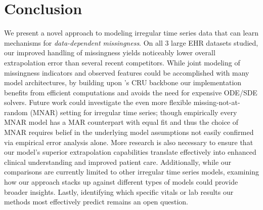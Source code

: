 \section{Conclusion}
We present a novel approach to modeling irregular time series data that can learn mechanisms for \emph{data-dependent missingness}. On all 3 large EHR datasets studied, our improved handling of missingness yields noticeably lower overall extrapolation error than several recent competitors.
While joint modeling of missingness indicators and observed features could be accomplished with many model architectures, by building upon \citet{schirmer2022modeling}'s  CRU backbone our implementation benefits from efficient computations and avoids the need for expensive ODE/SDE solvers.
Future work could investigate the even more flexible missing-not-at-random (MNAR) setting for irregular time series; 
though empirically every MNAR model has a MAR counterpart with equal fit 
\citep{molenbergsCounterpart2008} and thus the choice of MNAR requires belief in the underlying model assumptions not easily confirmed via empirical error analysis alone. More research is also necessary to ensure that our model's superior extrapolation capabilities translate effectively into enhanced clinical understanding and improved patient care. Additionally, while our comparisons are currently limited to other irregular time series models, examining how our approach stacks up against different types of models could provide broader insights. Lastly, identifying which specific vitals or lab results our methods most effectively predict remains an open question.